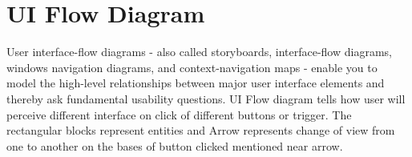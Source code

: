 \section{UI Flow Diagram}
User interface-flow diagrams - also called storyboards, interface-flow diagrams, windows navigation diagrams, and context-navigation maps - enable you to model the high-level relationships between major user interface elements and thereby ask fundamental usability questions. UI Flow diagram tells how user will perceive different interface on click of different buttons or trigger. The rectangular blocks represent entities and Arrow represents change of view from one to another on the bases of button clicked mentioned near arrow. 


